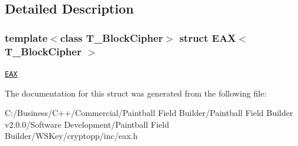 \subsection{Detailed Description}
\subsubsection*{template$<$class T\_\-BlockCipher$>$ struct EAX$<$ T\_\-BlockCipher $>$}

\href{http://www.cryptolounge.org/wiki/EAX}{\tt EAX} 

The documentation for this struct was generated from the following file:\begin{DoxyCompactItemize}
\item 
C:/Business/C++/Commercial/Paintball Field Builder/Paintball Field Builder v2.0.0/Software Development/Paintball Field Builder/WSKey/cryptopp/inc/eax.h\end{DoxyCompactItemize}
